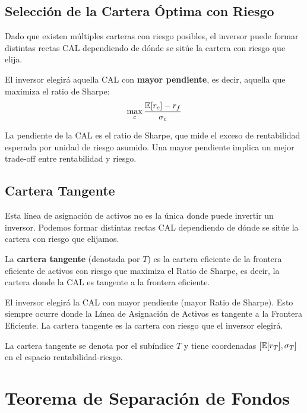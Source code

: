\subsection{Selección de la Cartera Óptima con Riesgo}

Dado que existen múltiples carteras con riesgo posibles, el inversor puede formar distintas rectas CAL dependiendo de dónde se sitúe la cartera con riesgo que elija.

\begin{teorema}
El inversor elegirá aquella CAL con \textbf{mayor pendiente}, es decir, aquella que maximiza el ratio de Sharpe:
\begin{equation}
\max_c \frac{\mathbb{E}[r_c] - r_f}{\sigma_c}
\end{equation}
\end{teorema}

La pendiente de la CAL es el ratio de Sharpe, que mide el exceso de rentabilidad esperada por unidad de riesgo asumido. Una mayor pendiente implica un mejor trade-off entre rentabilidad y riesgo.

\subsection{Cartera Tangente}

Esta línea de asignación de activos no es la única donde puede invertir un inversor. Podemos formar distintas rectas CAL dependiendo de dónde se sitúe la cartera con riesgo que elijamos.

\begin{definicion}
La \textbf{cartera tangente} (denotada por $T$) es la cartera eficiente de la frontera eficiente de activos con riesgo que maximiza el Ratio de Sharpe, es decir, la cartera donde la CAL es tangente a la frontera eficiente.
\end{definicion}

\begin{teorema}
El inversor elegirá la CAL con mayor pendiente (mayor Ratio de Sharpe). Esto siempre ocurre donde la Línea de Asignación de Activos es tangente a la Frontera Eficiente. La cartera tangente es la cartera con riesgo que el inversor elegirá.
\end{teorema}

La cartera tangente se denota por el subíndice $T$ y tiene coordenadas $[\mathbb{E}[r_T], \sigma_T]$ en el espacio rentabilidad-riesgo.

\section{Teorema de Separación de Fondos}

